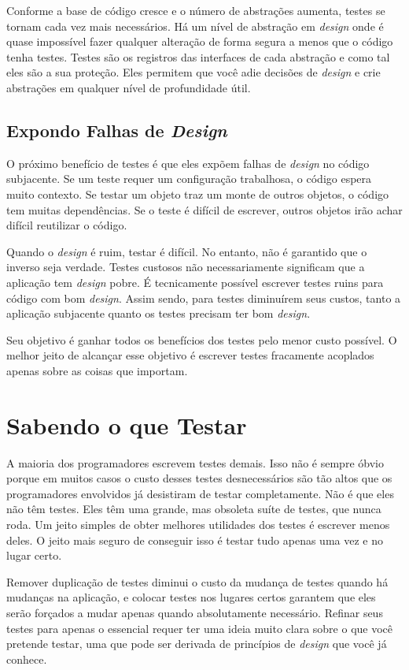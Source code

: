 Conforme a base de código cresce e o número de abstrações aumenta, testes se tornam cada vez mais necessários. Há um nível de abstração em \textit{design} onde é quase impossível fazer qualquer alteração de forma segura a menos que o código tenha testes. Testes são os registros das interfaces de cada abstração e como tal eles são a sua proteção. Eles permitem que você adie decisões de \textit{design} e crie abstrações em qualquer nível de profundidade útil.

\subsection{Expondo Falhas de \textit{Design}}

O próximo benefício de testes é que eles expõem falhas de \textit{design} no código subjacente. Se um teste requer um configuração trabalhosa, o código espera muito contexto. Se testar um objeto traz um monte de outros objetos, o código tem muitas dependências. Se o teste é difícil de escrever, outros objetos irão achar difícil reutilizar o código.

Quando o \textit{design} é ruim, testar é difícil. No entanto, não é garantido que o inverso seja verdade. Testes custosos não necessariamente significam que a aplicação tem \textit{design} pobre. É tecnicamente possível escrever testes ruins para código com bom \textit{design}. Assim sendo, para testes diminuírem seus custos, tanto a aplicação subjacente quanto os testes precisam ter bom \textit{design}.

Seu objetivo é ganhar todos os benefícios dos testes pelo menor custo possível. O melhor jeito de alcançar esse objetivo é escrever testes fracamente acoplados apenas sobre as coisas que importam.

\section{Sabendo o que Testar}

A maioria dos programadores escrevem testes demais. Isso não é sempre óbvio porque em muitos casos o custo desses testes desnecessários são tão altos que os programadores envolvidos já desistiram de testar completamente. Não é que eles não têm testes. Eles têm uma grande, mas obsoleta suíte de testes, que nunca roda. Um jeito simples de obter melhores utilidades dos testes é escrever menos deles. O jeito mais seguro de conseguir isso é testar tudo apenas uma vez e no lugar certo.

Remover duplicação de testes diminui o custo da mudança de testes quando há mudanças na aplicação, e colocar testes nos lugares certos garantem que eles serão forçados a mudar apenas quando absolutamente necessário. Refinar seus testes para apenas o essencial requer ter uma ideia muito clara sobre o que você pretende testar, uma que pode ser derivada de princípios de \textit{design} que você já conhece.

